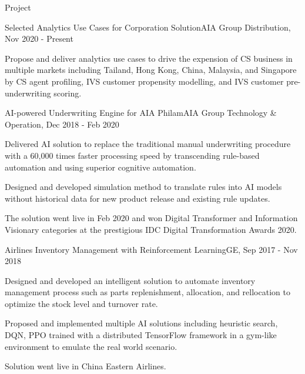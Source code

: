 \documentclass{resume} %
\begin{document}
\begin{rSection}{Project}

\begin{rSubsection}{Selected Analytics Use Cases for Corporation Solution}{}{AIA Group Distribution, Nov 2020 - Present}{}
\item Propose and deliver analytics use cases to drive the expension of CS business in multiple markets including Tailand, Hong Kong, China, Malaysia, and Singapore by CS agent profiling, IVS customer propensity modelling, and IVS customer pre-underwriting scoring.
\end{rSubsection}


\begin{rSubsection}{AI-powered Underwriting Engine for AIA Philam}{}{AIA Group Technology \& Operation, Dec 2018 - Feb 2020}{}
\item Delivered AI solution to replace the traditional manual underwriting procedure with a 60,000 times faster processing speed by transcending rule-based automation and using superior cognitive automation.
\item Designed and developed simulation method to translate rules into AI models without historical data for new product release and existing rule updates.
\item The solution went live in Feb 2020 and won Digital Transformer and Information Visionary categories at the prestigious IDC Digital Transformation Awards 2020.
\end{rSubsection}


\begin{rSubsection}{Airlines Inventory Management with Reinforcement Learning}{}{GE, Sep 2017 - Nov 2018}{}
\item Designed and developed an intelligent solution to automate inventory management process such as parts replenishment, allocation, and rellocation to optimize the stock level and turnover rate. 
\item Proposed and implemented multiple AI solutions including heuristic search, DQN, PPO trained with a distributed TensorFlow framework in a gym-like environment to emulate the real world scenario.
\item Solution went live in China Eastern Airlines.
\end{rSubsection}



\end{rSection}
\end{document}
